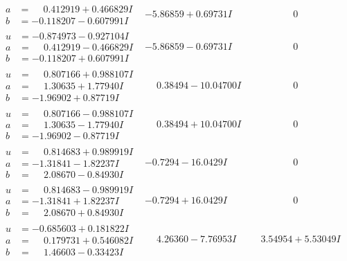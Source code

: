 \documentclass[1p]{elsarticle_modified}
\theoremstyle{definition}
\begin{document}
$$\begin{array}{c|c|c}
\begin{aligned}
a &= \phantom{-}0.412919 + 0.466829 I \\
b &= -0.118207 - 0.607991 I\end{aligned}
 & -5.86859 + 0.69731 I & \phantom{-0.000000 } 0 \\ \hline\begin{aligned}
u &= -0.874973 - 0.927104 I \\
a &= \phantom{-}0.412919 - 0.466829 I \\
b &= -0.118207 + 0.607991 I\end{aligned}
 & -5.86859 - 0.69731 I & \phantom{-0.000000 } 0 \\ \hline\begin{aligned}
u &= \phantom{-}0.807166 + 0.988107 I \\
a &= \phantom{-}1.30635 + 1.77940 I \\
b &= -1.96902 + 0.87719 I\end{aligned}
 & \phantom{-}0.38494 - 10.04700 I & \phantom{-0.000000 } 0 \\ \hline\begin{aligned}
u &= \phantom{-}0.807166 - 0.988107 I \\
a &= \phantom{-}1.30635 - 1.77940 I \\
b &= -1.96902 - 0.87719 I\end{aligned}
 & \phantom{-}0.38494 + 10.04700 I & \phantom{-0.000000 } 0 \\ \hline\begin{aligned}
u &= \phantom{-}0.814683 + 0.989919 I \\
a &= -1.31841 - 1.82237 I \\
b &= \phantom{-}2.08670 - 0.84930 I\end{aligned}
 & -0.7294 - 16.0429 I & \phantom{-0.000000 } 0 \\ \hline\begin{aligned}
u &= \phantom{-}0.814683 - 0.989919 I \\
a &= -1.31841 + 1.82237 I \\
b &= \phantom{-}2.08670 + 0.84930 I\end{aligned}
 & -0.7294 + 16.0429 I & \phantom{-0.000000 } 0 \\ \hline\begin{aligned}
u &= -0.685603 + 0.181822 I \\
a &= \phantom{-}0.179731 + 0.546082 I \\
b &= \phantom{-}1.46603 - 0.33423 I\end{aligned}
 & \phantom{-}4.26360 - 7.76953 I & \phantom{-}3.54954 + 5.53049 I \\ \hline\begin{aligned}

\end{aligned}
\end{array}$$
\end{document}
